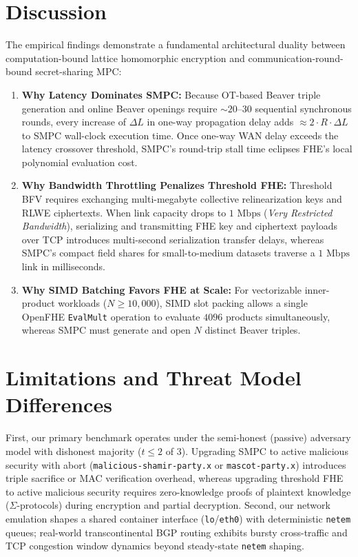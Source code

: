 \documentclass[conference]{IEEEtran}
\begin{document}
\section{Discussion}
The empirical findings demonstrate a fundamental architectural duality between computation-bound lattice homomorphic encryption and communication-round-bound secret-sharing MPC:
\begin{enumerate}
    \item \textbf{Why Latency Dominates SMPC:} Because OT-based Beaver triple generation and online Beaver openings require $\sim 20$--$30$ sequential synchronous rounds, every increase of $\Delta L$ in one-way propagation delay adds $\approx 2 \cdot R \cdot \Delta L$ to SMPC wall-clock execution time. Once one-way WAN delay exceeds the latency crossover threshold, SMPC's round-trip stall time eclipses FHE's local polynomial evaluation cost.
    \item \textbf{Why Bandwidth Throttling Penalizes Threshold FHE:} Threshold BFV requires exchanging multi-megabyte collective relinearization keys and RLWE ciphertexts. When link capacity drops to $1\text{ Mbps}$ (\emph{Very Restricted Bandwidth}), serializing and transmitting FHE key and ciphertext payloads over TCP introduces multi-second serialization transfer delays, whereas SMPC's compact field shares for small-to-medium datasets traverse a $1\text{ Mbps}$ link in milliseconds.
    \item \textbf{Why SIMD Batching Favors FHE at Scale:} For vectorizable inner-product workloads ($N \ge 10,000$), SIMD slot packing allows a single OpenFHE \texttt{EvalMult} operation to evaluate $4096$ products simultaneously, whereas SMPC must generate and open $N$ distinct Beaver triples.
\end{enumerate}

\section{Limitations and Threat Model Differences}
First, our primary benchmark operates under the semi-honest (passive) adversary model with dishonest majority ($t \le 2$ of $3$). Upgrading SMPC to active malicious security with abort (\texttt{malicious-shamir-party.x} or \texttt{mascot-party.x}) introduces triple sacrifice or MAC verification overhead, whereas upgrading threshold FHE to active malicious security requires zero-knowledge proofs of plaintext knowledge ($\Sigma$-protocols) during encryption and partial decryption. Second, our network emulation shapes a shared container interface (\texttt{lo}/\texttt{eth0}) with deterministic \texttt{netem} queues; real-world transcontinental BGP routing exhibits bursty cross-traffic and TCP congestion window dynamics beyond steady-state \texttt{netem} shaping.
\end{document}
